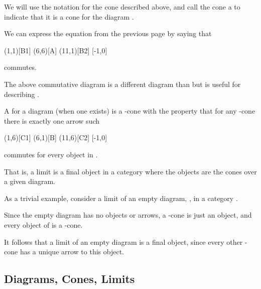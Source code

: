 \documentclass{seminar}
\newcommand{\vs}{\vspace{0.3in}}
\newcommand{\CC}{\tm{\cal C}}
\newcommand{\CCC}{\tm{{\cal C}\,}}
\begin{document}
\begin{slide}
\begin{codenott}
\end{codenott}

\vs

We will use the notation  for
the cone
described above, and call the cone a
 to indicate that it is a cone for the diagram
.

\newpage

We can express the equation  from
the previous page by saying that
\begin{cdiag}
\obj(1,1)[B1]{}
\obj(6,6)[A]{}
\obj(11,1)[B2]{}
[-1,0]
\end{cdiag}
commutes.

The above commutative diagram is a different diagram than 
but
is useful for describing .

\newpage

A  for a diagram  (when one exists) is a
-cone
 with the
property that for any -cone
 there is
exactly
one arrow  such
\begin{cdiag}
\obj(1,6)[C1]{}
\obj(6,1)[B]{}
\obj(11,6)[C2]{}
 [-1,0]
\end{cdiag}
commutes for every object  in .

\vs

That is, a limit is a final object in a category where the objects are the cones over a given diagram.

\newpage

As a trivial example, consider a limit of an empty diagram, ,
in a category \CC.

Since the empty diagram has no objects or arrows, a -cone is
just an object, and every object of \CCC is a -cone.

It follows that a limit of an empty diagram is a final object,
since every other -cone has a unique arrow to this object.

\newslide

\subsection*{Diagrams, Cones, Limits}


\end{slide}
\end{document}
